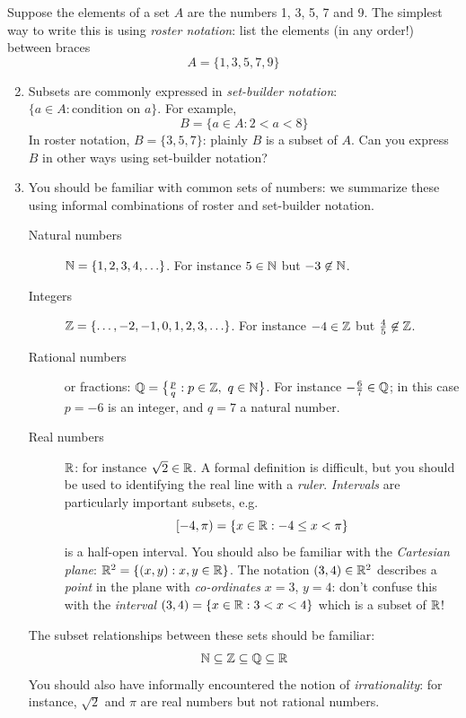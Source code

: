 \begin{examples}{}{}
	\exstart Suppose the elements of a set $A$ are the numbers 1, 3, 5, 7 and 9. The simplest way to write this is using \emph{roster notation}: list the elements (in any order!) between braces
	\[
		A=\{1,3,5,7,9\}
	\]
	\begin{enumerate}\setcounter{enumi}{1}
	  \item[]Subsets are commonly expressed in \emph{set-builder notation}: $\{a\in A:\text{condition on $a$}\}$. For example,
	 	\[
	 		B=\{a\in A:2<a<8\} \tag{the set of $a$ in $A$ such that $a$ lies strictly between 2 and 8}
	 	\]
	 	In roster notation, $B=\{3,5,7\}$: plainly $B$ is a subset of $A$. Can you express $B$ in other ways using set-builder notation?
	  \goodbreak
  
	  \item You should be familiar with common sets of numbers: we summarize these using informal combinations of roster and set-builder notation.
	  \begin{description}
			\item[Natural numbers] $\mathbb{N}=\{1,2,3,4,\ldots\}$. For instance $5\in\mathbb{N}$ but $-3\not\in\mathbb{N}$.
			\item[Integers] $\mathbb{Z}=\{\ldots,-2,-1,0,1,2,3,\ldots\}$. For instance $-4\in\mathbb{Z}$ but $\frac 45\not\in\mathbb{Z}$.
			\item[Rational numbers] or fractions: $\mathbb{Q}=\bigl\{\frac pq:p\in\mathbb{Z},\ q\in\mathbb{N}\bigr\}$. For instance $-\frac 67\in\mathbb{Q}$; in this case $p=-6$ is an integer, and $q=7$ a natural number.
			\item[Real numbers] $\mathbb{R}$: for instance $\sqrt 2\in\mathbb{R}$. A formal definition is difficult, but you should be used to identifying the real line with a \emph{ruler}. \emph{Intervals} are particularly important subsets, e.g.
			\[
				[-4,\pi)=\{x\in\mathbb{R}:-4\le x<\pi\}
			\]
			is a half-open interval.\smallbreak
			You should also be familiar with the \emph{Cartesian plane}: $\mathbb{R}^2=\{(x,y):x,y\in\mathbb{R}\}$. The notation $(3,4)\in\mathbb{R}^2$ describes a \emph{point} in the plane with \emph{co-ordinates} $x=3$, $y=4$: don't confuse this with the \emph{interval} $(3,4)=\{x\in\mathbb{R}:3<x<4\}$ which is a subset of $\mathbb{R}$!
		\end{description}
		The subset relationships between these sets should be familiar:
		\[
			\N\subseteq\Z\subseteq\Q\subseteq\R%
		\]
		You should also have informally encountered the notion of \emph{irrationality}: for instance, $\sqrt 2$ and $\pi$ are real numbers but not rational numbers.
	\end{enumerate}
\end{examples}

